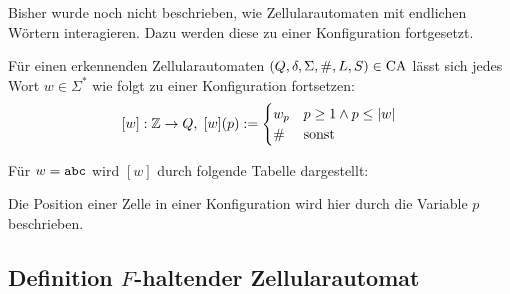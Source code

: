 Bisher wurde noch nicht beschrieben, wie Zellularautomaten mit endlichen Wörtern interagieren. Dazu werden diese zu einer Konfiguration fortgesetzt.

\begin{definition}
   Für einen erkennenden Zellularautomaten $(Q, \delta, \Sigma, \#, L, S) \in \textrm{CA}$
   lässt sich jedes Wort $w \in \Sigma^*$ wie folgt zu einer Konfiguration fortsetzen:
   \[
       [w]: \mathbb{Z} \to Q, \;
       [w](p) :=
       \begin{cases} 
          w_p & p \geq 1 \land p \leq |w| \\
          \# & \text{sonst}
       \end{cases}
   \]
\end{definition}

\begin{exmp}[Konfiguration]
    Für $w = \texttt{abc}$ wird $[w]$ durch folgende Tabelle dargestellt:
    
    \begin{center}
    \end{center}
    
    Die Position einer Zelle in einer Konfiguration wird hier durch die Variable $p$ beschrieben.
\end{exmp}


\subsection{Definition \texorpdfstring{$F$}{F}-haltender Zellularautomat}



